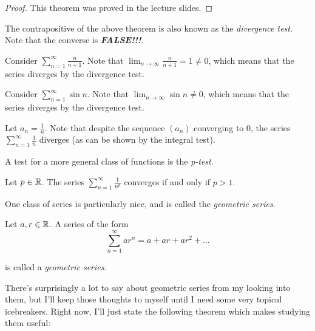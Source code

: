 \documentclass{article}
\begin{document}
    \begin{proof}
      This theorem was proved in the lecture slides.
    \end{proof}

    The contrapositive of the above theorem is also known as the \emph{divergence test}. Note that the converse is \emph{\textbf{FALSE!!!}}.
{
  \everymath{\displaystyle}
    \begin{eg}
      
      Consider \(\sum_{n=1}^{\infty} \frac{n}{n+1}\). Note that \(\lim_{n \to \infty}\frac{n}{n+1} = 1 \neq 0\), which means that the series diverges by the divergence test.
    \end{eg}

    \begin{eg}
      Consider \(\sum_{n=1}^{\infty} \sin{n}\). Note that \(\lim_{n \to \infty}\sin{n} \neq 0\), which means that the series diverges by the divergence test.
    \end{eg}

    \begin{eg}
      Let \(a_n = \frac{1}{n}\). Note that despite the sequence \((a_n)\) converging to 0, the series \(\displaystyle \sum_{n=1}^{\infty}\frac{1}{n}\) diverges (as can be shown by the integral test).
    \end{eg}
}

    A test for a more general class of functions is the \emph{p-test}.

    \begin{prop}
      \everymath{\displaystyle}
      Let \(p \in \mathbb{R}\). The series \(\sum_{n=1}^{\infty}\frac{1}{n^p}\) converges if and only if \(p > 1\).
    \end{prop}
    One class of series is particularly nice, and is called the \emph{geometric series}.

    \begin{defi}
      Let \(a, r \in \mathbb{R}\). A series of the form 
      \[
        \sum_{n=1}^{\infty}ar^n = a + ar + ar^2 + \ldots
      \]
      
      is called a \emph{geometric series}.
    \end{defi}

    There's surprisingly a lot to say about geometric series from my looking into them, but I'll keep those thoughts to myself until I need some very topical icebreakers. Right now, I'll just state the following theorem which makes studying them useful:
\end{document}
